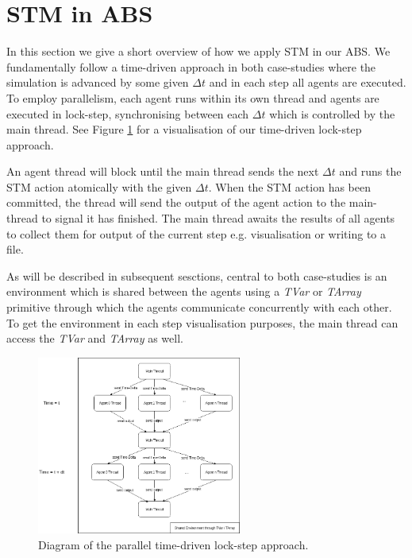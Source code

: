 \section{STM in ABS}
\label{sec:stm_abs}
In this section we give a short overview of how we apply STM in our ABS. We fundamentally follow a time-driven approach in both case-studies where the simulation is advanced by some given $\Delta t$ and in each step all agents are executed. To employ parallelism, each agent runs within its own thread and agents are executed in lock-step, synchronising between each $\Delta t$ which is controlled by the main thread. See Figure \ref{fig:stm_abs_structure} for a visualisation of our time-driven lock-step approach.

An agent thread will block until the main thread sends the next $\Delta t$ and runs the STM action atomically with the given $\Delta t$. When the STM action has been committed, the thread will send the output of the agent action to the main-thread to signal it has finished. The main thread awaits the results of all agents to collect them for output of the current step e.g. visualisation or writing to a file.

As will be described in subsequent sesctions, central to both case-studies is an environment which is shared between the agents using a \textit{TVar} or \textit{TArray} primitive through which the agents communicate concurrently with each other. To get the environment in each step visualisation purposes, the main thread can access the \textit{TVar} and \textit{TArray} as well. 

\begin{figure}
	\centering
	\includegraphics[width=0.6\textwidth, angle=0]{./fig/dia/stm_abs.png}
	\caption{Diagram of the parallel time-driven lock-step approach.}
	\label{fig:stm_abs_structure}
\end{figure}